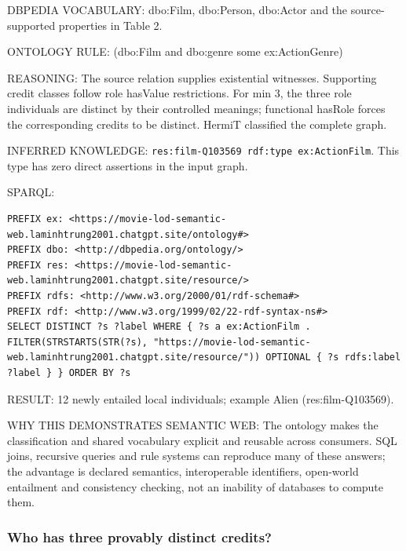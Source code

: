 \documentclass[
  11pt,
]{article}
\begin{document}
DBPEDIA VOCABULARY: dbo:Film, dbo:Person, dbo:Actor and the
source-\allowbreak{}s\allowbreak{}upported\allowbreak{} properties in
Table 2.

ONTOLOGY RULE: (dbo:Film and dbo:genre some
ex:\allowbreak{}\allowbreak{}Actio\allowbreak{}n\allowbreak{}Genre)

REASONING: The source relation supplies existential witnesses.
Supporting credit classes follow role hasValue
restrict\allowbreak{}ions.\allowbreak{} For min 3, the three role
individuals are distinct by their controlled meanings; functional
hasRole forces the correspo\allowbreak{}nding credits to be distinct.
HermiT classified the complete graph.

INFERRED KNOWLEDGE:
\texttt{res:\allowbreak{}film\allowbreak{}-\allowbreak{}\allowbreak{}Q103569\allowbreak{} rdf:\allowbreak{}typ\allowbreak{}e ex:\allowbreak{}\allowbreak{}Act\allowbreak{}ion\allowbreak{}Film}.
This type has zero direct assertions in the input graph.

SPARQL:

\begin{verbatim}
PREFIX ex: <https://movie-lod-semantic-web.laminhtrung2001.chatgpt.site/ontology#>
PREFIX dbo: <http://dbpedia.org/ontology/>
PREFIX res: <https://movie-lod-semantic-web.laminhtrung2001.chatgpt.site/resource/>
PREFIX rdfs: <http://www.w3.org/2000/01/rdf-schema#>
PREFIX rdf: <http://www.w3.org/1999/02/22-rdf-syntax-ns#>
SELECT DISTINCT ?s ?label WHERE { ?s a ex:ActionFilm . FILTER(STRSTARTS(STR(?s), "https://movie-lod-semantic-web.laminhtrung2001.chatgpt.site/resource/")) OPTIONAL { ?s rdfs:label ?label } } ORDER BY ?s
\end{verbatim}

RESULT: 12 newly entailed local individuals; example Alien
(res:\allowbreak{}fil\allowbreak{}m-\allowbreak{}\allowbreak{}Q10356\allowbreak{}9).\allowbreak{}

WHY THIS DEMONSTRATES SEMANTIC WEB: The ontology makes the
classifi\allowbreak{}cation and shared vocabulary explicit and reusable
across consumers. SQL joins, recursive queries and rule systems can
reproduce many of these answers; the advantage is declared semantics,
interope\allowbreak{}rable identifiers, open-world entailment and
consistency checking, not an inability of databases to compute them.

\subsubsection{Who has three provably distinct
credits?}\label{who-has-three-provably-distinct-credits}
\end{document}
